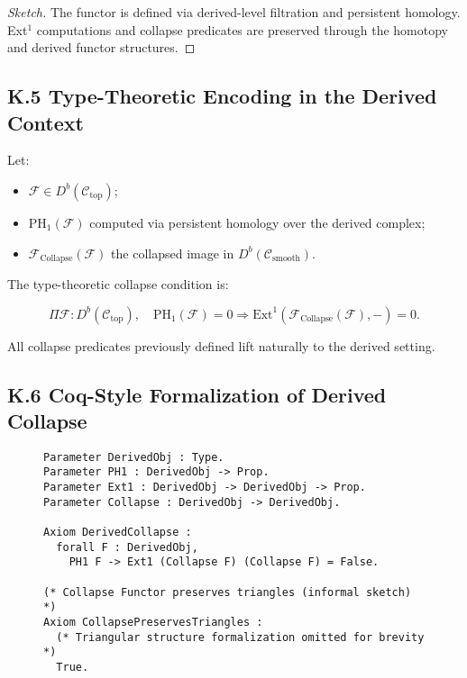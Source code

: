 \documentclass[11pt]{article}
\begin{document}
\begin{proof}[Sketch]
The functor is defined via derived-level filtration and persistent homology. Ext$^1$ computations and collapse predicates are preserved through the homotopy and derived functor structures.
\end{proof}

\subsection*{K.5 Type-Theoretic Encoding in the Derived Context}

Let:

\begin{itemize}
    \item \( \mathcal{F} \in D^b(\mathcal{C}_{\mathrm{top}}) \);
    \item \( \mathrm{PH}_1(\mathcal{F}) \) computed via persistent homology over the derived complex;
    \item \( \mathcal{F}_{\mathrm{Collapse}}(\mathcal{F}) \) the collapsed image in \( D^b(\mathcal{C}_{\mathrm{smooth}}) \).
\end{itemize}

The type-theoretic collapse condition is:

\[
\Pi \mathcal{F} : D^b(\mathcal{C}_{\mathrm{top}}), \quad \mathrm{PH}_1(\mathcal{F}) = 0 \Rightarrow \mathrm{Ext}^1(\mathcal{F}_{\mathrm{Collapse}}(\mathcal{F}), -) = 0.
\]

All collapse predicates previously defined lift naturally to the derived setting.

\subsection*{K.6 Coq-Style Formalization of Derived Collapse}

\begin{figure}[h]
\centering
\begin{lstlisting}[language=Coq, mathescape=false]
Parameter DerivedObj : Type.
Parameter PH1 : DerivedObj -> Prop.
Parameter Ext1 : DerivedObj -> DerivedObj -> Prop.
Parameter Collapse : DerivedObj -> DerivedObj.

Axiom DerivedCollapse :
  forall F : DerivedObj,
    PH1 F -> Ext1 (Collapse F) (Collapse F) = False.

(* Collapse Functor preserves triangles (informal sketch) *)
Axiom CollapsePreservesTriangles :
  (* Triangular structure formalization omitted for brevity *)
  True.
\end{lstlisting}
\end{figure}
\end{document}
